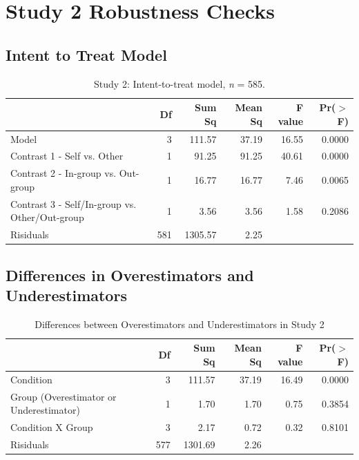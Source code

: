 \documentclass[12pt,]{article}
\begin{document}

\newpage
\section{Study 2 Robustness Checks}
\label{appendix:robust2}


\subsection{Intent to Treat Model}
\label{appendix:itt2}


\begin{table}[ht]
\centering
\begin{tabular}{lrrrrr}
  \hline
 & Df & Sum Sq & Mean Sq & F value & Pr($>$F) \\ 
  \hline
Model & 3 & 111.57 & 37.19 & 16.55 & 0.0000 \\ 
  Contrast 1 - Self vs. Other & 1 & 91.25 & 91.25 & 40.61 & 0.0000 \\ 
  Contrast 2 - In-group vs. Out-group & 1 & 16.77 & 16.77 & 7.46 & 0.0065 \\ 
  Contrast 3 - Self/In-group vs. Other/Out-group & 1 & 3.56 & 3.56 & 1.58 & 0.2086 \\ 
  Risiduals & 581 & 1305.57 & 2.25 &  &  \\ 
   \hline
\end{tabular}
\caption{Study 2: Intent-to-treat model, \emph{n} = 585. } 
\label{ITT2}
\end{table}



\clearpage
\subsection{Differences in Overestimators and Underestimators}
\label{appendix:over_under2}

\begin{table}[ht]
\centering
\begin{tabular}{lrrrrr}
  \hline
 & Df & Sum Sq & Mean Sq & F value & Pr($>$F) \\ 
  \hline
Condition & 3 & 111.57 & 37.19 & 16.49 & 0.0000 \\ 
  Group (Overestimator or Underestimator) & 1 & 1.70 & 1.70 & 0.75 & 0.3854 \\ 
  Condition X Group & 3 & 2.17 & 0.72 & 0.32 & 0.8101 \\ 
  Risiduals & 577 & 1301.69 & 2.26 &  &  \\ 
   \hline
\end{tabular}
\caption{Differences between Overestimators and Underestimators in Study 2} 
\label{over_underS2}
\end{table}
\end{document}
